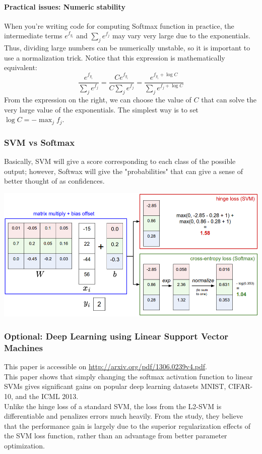 \documentclass{article}
\begin{document}
\paragraph{Practical issues: Numeric stability} When you're writing code for computing Softmax function in practice, the intermediate terms $e^{f_{y_i}}$ and $\sum_j e^{f_j}$ may vary very large due to the exponentials. Thus, dividing large numbers can be numerically unstable, so it is important to use a normalization trick. Notice that this expression is mathematically equivalent:
\begin{equation*}
	\frac{e^{f_{y_i}}}{\sum_j e^{f_j}} = \frac{Ce^{f_{y_i}}}{C\sum_j e^{f_j}} =
	\frac{e^{f_{y_i} + \log C}}{\sum_j e^{f_j + \log C}}
\end{equation*}
From the expression on the right, we can choose the value of $C$ that can solve the very large value of the exponentials. The simplest way is to set $\log C = -\max_j f_j$.

\subsubsection{SVM vs Softmax}
Basically, SVM will give a score corresponding to each class of the possible output; however, Softwax will give the "probabilities" that can give a sense of better thought of as confidences.
\begin{center}
	\includegraphics[scale=0.3]{images/svmvssoftmax.png}
\end{center}

\subsubsection{Optional: Deep Learning using Linear Support Vector Machines}
This paper is accessible on \url{http://arxiv.org/pdf/1306.0239v4.pdf}. \\
\indent This paper shows that simply changing the softmax activation function to linear SVMs gives significant gains on popular deep learning datasets MNIST, CIFAR-10, and the ICML 2013. \\
\indent Unlike the hinge loss of a standard SVM, the loss from the L2-SVM is differentiable and penalizes errors much heavily. From the study, they believe that the performance gain is largely due to the superior regularization effects of the SVM loss function, rather than an advantage from better parameter optimization.
\end{document}
